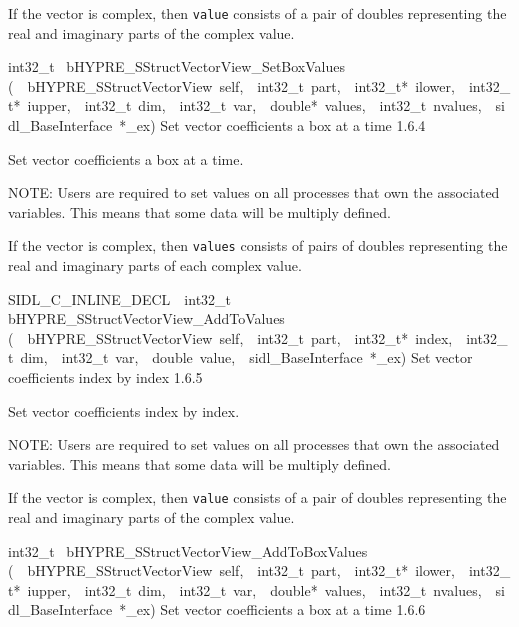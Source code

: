 \documentclass{article}
\begin{document}
\begin{cxxentry}
\begin{cxxentry}
\begin{cxxfunction}
\begin{cxxdoc}
If the vector is complex, then {\tt value} consists of a pair
of doubles representing the real and imaginary parts of the
complex value.
\end{cxxdoc}
\end{cxxfunction}
\begin{cxxfunction}
{int32\_t\ }
        {bHYPRE\_SStructVectorView\_SetBoxValues}
        {(\ \ bHYPRE\_SStructVectorView\ self,\ \ int32\_t\ part,\ \ int32\_t*\ ilower,\ \ int32\_t*\ iupper,\ \ int32\_t\ dim,\ \ int32\_t\ var,\ \ double*\ values,\ \ int32\_t\ nvalues,\ \ sidl\_BaseInterface\ *\_ex)}
        {
Set vector coefficients a box at a time}
        {1.6.4}
\begin{cxxdoc}

Set vector coefficients a box at a time.

NOTE: Users are required to set values on all processes that
own the associated variables.  This means that some data will
be multiply defined.

If the vector is complex, then {\tt values} consists of pairs
of doubles representing the real and imaginary parts of each
complex value.
\end{cxxdoc}
\end{cxxfunction}
\begin{cxxfunction}
{SIDL\_C\_INLINE\_DECL\ \ int32\_t\ }
        {bHYPRE\_SStructVectorView\_AddToValues}
        {(\ \ bHYPRE\_SStructVectorView\ self,\ \ int32\_t\ part,\ \ int32\_t*\ index,\ \ int32\_t\ dim,\ \ int32\_t\ var,\ \ double\ value,\ \ sidl\_BaseInterface\ *\_ex)}
        {
Set vector coefficients index by index}
        {1.6.5}
\begin{cxxdoc}

Set vector coefficients index by index.

NOTE: Users are required to set values on all processes that
own the associated variables.  This means that some data will
be multiply defined.

If the vector is complex, then {\tt value} consists of a pair
of doubles representing the real and imaginary parts of the
complex value.
\end{cxxdoc}
\end{cxxfunction}
\begin{cxxfunction}
{int32\_t\ }
        {bHYPRE\_SStructVectorView\_AddToBoxValues}
        {(\ \ bHYPRE\_SStructVectorView\ self,\ \ int32\_t\ part,\ \ int32\_t*\ ilower,\ \ int32\_t*\ iupper,\ \ int32\_t\ dim,\ \ int32\_t\ var,\ \ double*\ values,\ \ int32\_t\ nvalues,\ \ sidl\_BaseInterface\ *\_ex)}
        {
Set vector coefficients a box at a time}
        {1.6.6}
\begin{cxxdoc}


\end{cxxdoc}
\end{cxxfunction}
\end{cxxentry}
\end{cxxentry}
\end{document}
